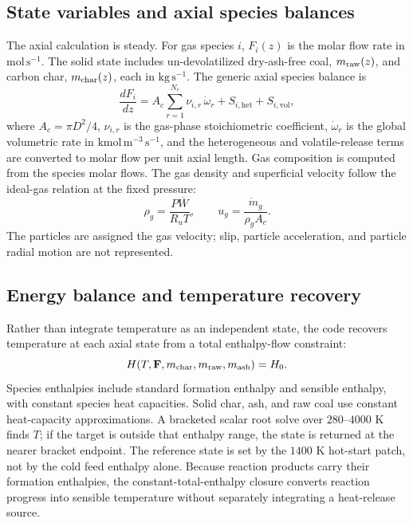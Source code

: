 \documentclass[journal]{IEEEtran}
\begin{document}
\subsection{State variables and axial species balances}
The axial calculation is steady. For gas species \(i\), \(F_i(z)\) is the molar flow rate in \(\mathrm{mol\,s^{-1}}\). The solid state includes un-devolatilized dry-ash-free coal, \(m_{\rm raw}(z)\), and carbon char, \(m_{\rm char}(z)\), each in \(\mathrm{kg\,s^{-1}}\). The generic axial species balance is
\begin{equation}
\frac{dF_i}{dz}
= A_c\sum_{r=1}^{N_r}\nu_{i,r}\,\dot{\omega}_r
+ S_{i,\mathrm{het}} + S_{i,\mathrm{vol}},
\label{eq:species}
\end{equation}
where \(A_c=\pi D^2/4\), \(\nu_{i,r}\) is the gas-phase stoichiometric coefficient, \(\dot{\omega}_r\) is the global volumetric rate in \(\mathrm{kmol\,m^{-3}\,s^{-1}}\), and the heterogeneous and volatile-release terms are converted to molar flow per unit axial length. Gas composition is computed from the species molar flows. The gas density and superficial velocity follow the ideal-gas relation at the fixed pressure:
\begin{equation}
\rho_g = \frac{P\overline{W}}{R_uT}, \qquad
u_g = \frac{\dot{m}_g}{\rho_g A_c}.
\label{eq:velocity}
\end{equation}
The particles are assigned the gas velocity; slip, particle acceleration, and particle radial motion are not represented.

\subsection{Energy balance and temperature recovery}
Rather than integrate temperature as an independent state, the code recovers temperature at each axial state from a total enthalpy-flow constraint:
\begin{equation}
H(T,\mathbf{F},m_{\rm char},m_{\rm raw},m_{\rm ash})=H_0.
\label{eq:enthalpy}
\end{equation}
Species enthalpies include standard formation enthalpy and sensible enthalpy, with constant species heat capacities. Solid char, ash, and raw coal use constant heat-capacity approximations. A bracketed scalar root solve over \(280\)--\(4000\) K finds \(T\); if the target is outside that enthalpy range, the state is returned at the nearer bracket endpoint. The reference state is set by the \(1400\) K hot-start patch, not by the cold feed enthalpy alone. Because reaction products carry their formation enthalpies, the constant-total-enthalpy closure converts reaction progress into sensible temperature without separately integrating a heat-release source.
\end{document}
